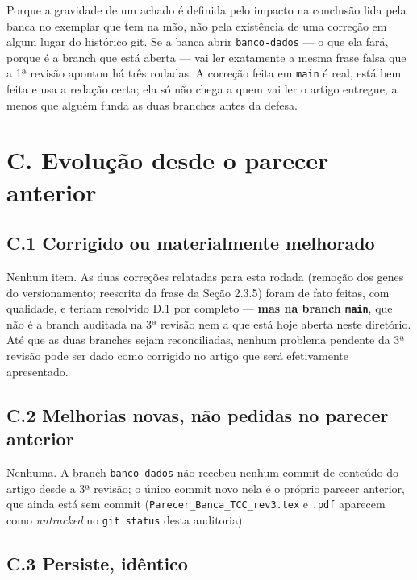 \documentclass[11pt,a4paper]{article}
\begin{document}
Porque a gravidade de um achado é definida pelo impacto na conclusão lida pela banca no exemplar que
tem na mão, não pela existência de uma correção em algum lugar do histórico git. Se a banca abrir
\texttt{banco-dados} --- o que ela fará, porque é a branch que está aberta --- vai ler exatamente a
mesma frase falsa que a 1ª revisão apontou há três rodadas. A correção feita em \texttt{main} é real,
está bem feita e usa a redação certa; ela só não chega a quem vai ler o artigo entregue, a menos que
alguém funda as duas branches antes da defesa.

\section*{C. Evolução desde o parecer anterior}

\subsection*{C.1 Corrigido ou materialmente melhorado}

Nenhum item. As duas correções relatadas para esta rodada (remoção dos genes do versionamento;
reescrita da frase da Seção 2.3.5) foram de fato feitas, com qualidade, e teriam resolvido D.1 por
completo --- \textbf{mas na branch \texttt{main}}, que não é a branch auditada na 3ª revisão nem a
que está hoje aberta neste diretório. Até que as duas branches sejam reconciliadas, nenhum problema
pendente da 3ª revisão pode ser dado como corrigido no artigo que será efetivamente apresentado.

\subsection*{C.2 Melhorias novas, não pedidas no parecer anterior}

Nenhuma. A branch \texttt{banco-dados} não recebeu nenhum commit de conteúdo do artigo desde a 3ª
revisão; o único commit novo nela é o próprio parecer anterior, que ainda está sem commit
(\texttt{Parecer\_Banca\_TCC\_rev3.tex} e \texttt{.pdf} aparecem como \textit{untracked} no
\texttt{git status} desta auditoria).

\subsection*{C.3 Persiste, idêntico}
\end{document}
